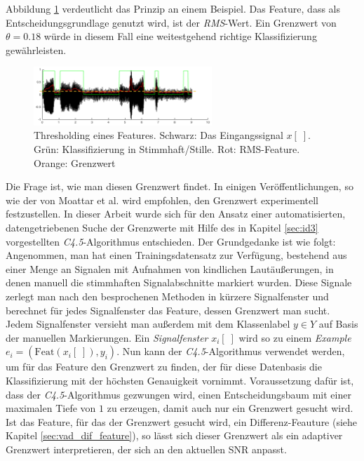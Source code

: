 Abbildung \ref{img:thresholded} verdeutlicht das Prinzip an einem Beispiel. Das Feature, dass als Entscheidungsgrundlage genutzt wird, ist der \emph{RMS}-Wert. Ein Grenzwert von $\theta = 0.18$ würde in diesem Fall eine weitestgehend richtige Klassifizierung gewährleisten.

\begin{figure}[h]
	\centering
	\includegraphics[width=0.6\textwidth]{bilder/thresholded02.png}
	\caption{Thresholding eines Features. Schwarz: Das Eingangssignal $x[\;]$. Grün: Klassifizierung in Stimmhaft/Stille. Rot: RMS-Feature. Orange: Grenzwert}
	\label{img:thresholded}
\end{figure}

Die Frage ist, wie man diesen Grenzwert findet. In einigen Veröffentlichungen, so wie der von Moattar et al. \cite{vad_Easy} wird empfohlen, den Grenzwert experimentell festzustellen. In dieser Arbeit wurde sich für den Ansatz einer automatisierten, datengetriebenen Suche der Grenzwerte mit Hilfe des in Kapitel \ref{sec:id3} vorgestellten \emph{C4.5}-Algorithmus entschieden. Der Grundgedanke ist wie folgt: Angenommen, man hat einen Trainingsdatensatz zur Verfügung, bestehend aus einer Menge an Signalen mit Aufnahmen von kindlichen Lautäußerungen, in denen manuell die stimmhaften Signalabschnitte markiert wurden. Diese Signale zerlegt man nach den besprochenen Methoden in kürzere Signalfenster und berechnet für jedes Signalfenster das Feature, dessen Grenzwert man sucht. Jedem Signalfenster versieht man außerdem mit dem Klassenlabel $y \in Y$ auf Basis der manuellen Markierungen. Ein \emph{Signalfenster} $x_i[\;]$ wird so zu einem \emph{Example} $e_i = (\text{Feat}(x_i[\;]), y_i)$. Nun kann der \emph{C4.5}-Algorithmus verwendet werden, um für das Feature den Grenzwert zu finden, der für diese Datenbasis die Klassifizierung mit der höchsten Genauigkeit vornimmt. Voraussetzung dafür ist, dass der \emph{C4.5}-Algorithmus gezwungen wird, einen Entscheidungsbaum mit einer maximalen Tiefe von $1$ zu erzeugen, damit auch nur ein Grenzwert gesucht wird. Ist das Feature, für das der Grenzwert gesucht wird, ein Differenz-Feauture (siehe Kapitel \ref{sec:vad_dif_feature}), so lässt sich dieser Grenzwert als ein adaptiver Grenzwert interpretieren, der sich an den aktuellen SNR anpasst.

